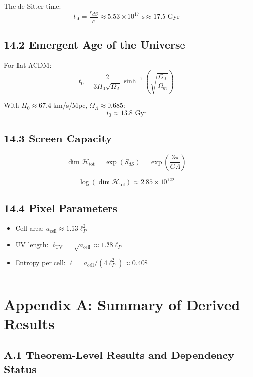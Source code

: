 The de Sitter time: \[t_\Lambda = \frac{r_{dS}}{c} \approx 5.53 \times 10^{17} \text{ s} \approx 17.5 \text{ Gyr}\]

\subsection{14.2 Emergent Age of the Universe}\label{142-emergent-age-of-the-universe}

For flat ΛCDM: \[t_0 = \frac{2}{3H_0\sqrt{\Omega_\Lambda}} \sinh^{-1}\left(\sqrt{\frac{\Omega_\Lambda}{\Omega_m}}\right)\]

With \(H_0 \approx 67.4\) km/s/Mpc, \(\Omega_\Lambda \approx 0.685\): \[t_0 \approx 13.8 \text{ Gyr}\]

\subsection{14.3 Screen Capacity}\label{143-screen-capacity}

\[\dim \mathcal{H}_{\text{tot}} = \exp(S_{dS}) = \exp\left(\frac{3\pi}{G\Lambda}\right)\]

\[\log(\dim \mathcal{H}_{\text{tot}}) \approx 2.85 \times 10^{122}\]

\subsection{14.4 Pixel Parameters}\label{144-pixel-parameters}

\begin{itemize}
\tightlist
\item
  Cell area: \(a_{\text{cell}} \approx 1.63 \ell_P^2\)
\item
  UV length: \(\ell_{\text{UV}} = \sqrt{a_{\text{cell}}} \approx 1.28 \ell_P\)
\item
  Entropy per cell: \(\bar{\ell} = a_{\text{cell}}/(4\ell_P^2) \approx 0.408\)
\end{itemize}

\begin{center}\rule{0.5\linewidth}{0.5pt}\end{center}

\section{Appendix A: Summary of Derived Results}\label{appendix-a-summary-of-derived-results}

\subsection{A.1 Theorem-Level Results and Dependency Status}\label{a1-theorem-level-results}

